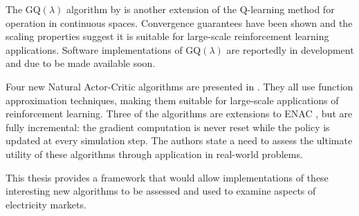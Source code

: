The GQ$(\lambda)$ algorithm by  is another extension of the
Q-learning method for operation in continuous spaces.  Convergence guarantees
have been shown and the scaling properties suggest it is suitable for
large-scale reinforcement learning applications.  Software implementations of
GQ$(\lambda)$ are reportedly in development and due to be made available soon.

Four new Natural Actor-Critic algorithms are presented in .
They all use function approximation techniques, making them suitable for
large-scale applications of reinforcement learning.  Three of the algorithms
are extensions to ENAC \cite{peters:enac}, but are fully incremental: the
gradient computation is never reset while the policy is updated at every
simulation step.  The authors state a need to assess the ultimate utility of
these algorithms through application in real-world problems.

This thesis provides a framework that would allow implementations of these
interesting new algorithms to be assessed and used to examine aspects of
electricity markets.


